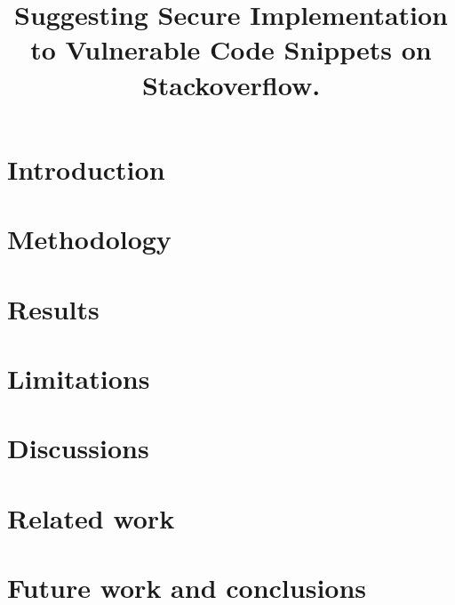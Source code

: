 \documentclass[sigconf]{acmart}
\begin{document}
\title{Suggesting Secure Implementation to Vulnerable Code Snippets on Stackoverflow.}
\begin{abstract}  
\end{abstract}
\maketitle
\section{Introduction}

%
\section{Methodology}

\section{Results}
      
\section{Limitations}
\section{Discussions}
\section{Related work}
\section{Future work and conclusions}



  

\end{document}

